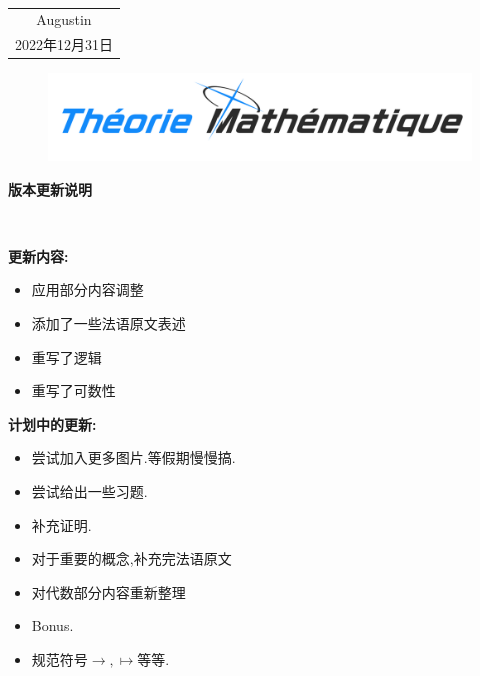 \documentclass[12pt, a4paper, oneside]{ctexbook}
\begin{document}
~\\
\begin{flushright}
    \begin{tabular}{c}
        Augustin\\
        2022年12月31日
    \end{tabular}
\end{flushright}


\newpage
\begin{center}
  \begin{figure}[H]%
    \centering
    \includegraphics[scale=0.3]{theo_math.png}
  \end{figure}
  \Huge\textbf{版本更新说明}
\end{center}~\


\noindent
\textbf{更新内容:}
\begin{itemize}
  \item 应用部分内容调整
  \item 添加了一些法语原文表述
  \item 重写了逻辑
  \item 重写了可数性
\end{itemize}

\noindent
\textbf{计划中的更新:}
\begin{itemize}
  \item 尝试加入更多图片.等假期慢慢搞.
  \item 尝试给出一些习题.
  \item 补充证明.
  \item 对于重要的概念,补充完法语原文
  \item 对代数部分内容重新整理
  \item Bonus.
  \item 规范符号$\rightarrow,\mapsto $等等.
\end{itemize}




\newpage
{}
\setcounter{page}{1}
\tableofcontents

\newpage
\setcounter{page}{1}
\end{document}
